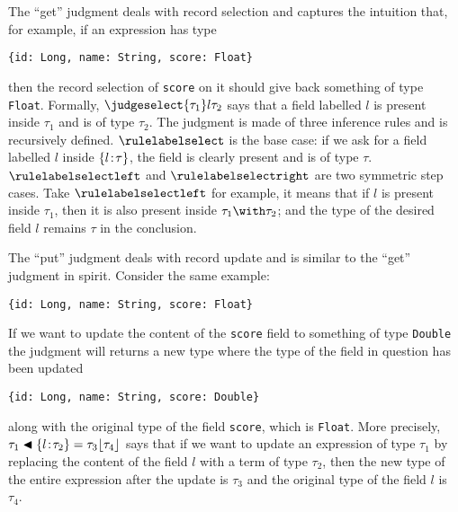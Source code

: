 The ``get'' judgment deals with record selection and captures the intuition
that, for example, if an expression has type
\begin{lstlisting}
{id: Long, name: String, score: Float}
\end{lstlisting}
then the record selection of \lstinline$score$ on it should give back something
of type \lstinline$Float$. Formally, $\judgeselect {\tau_1} l {\tau_2}$ says that a
field labelled $l$ is present inside $\tau_1$ and is of type $\tau_2$. The
judgment is made of three inference rules and is recursively defined.
$\rulelabelselect$ is the base case: if we ask for a field labelled $l$ inside
$\{ l \!:\! \tau \}$, the field is clearly present and is of type $\tau$.
$\rulelabelselectleft$ and $\rulelabelselectright$ are two symmetric step cases. Take
$\rulelabelselectleft$ for example, it means that if $l$ is present inside
$\tau_1$, then it is also present inside $\tau_1 \andop \tau_2$; and the type of
the desired field $l$ remains $\tau$ in the conclusion.

The ``put'' judgment deals with record update and is similar to the ``get''
judgment in spirit. Consider the same example:
\begin{lstlisting}
{id: Long, name: String, score: Float}
\end{lstlisting}
If we want to update the content of the \lstinline$score$ field to something of
type \lstinline$Double$ the judgment will returns a new type where the type of
the field in question has been updated
\begin{lstlisting}
{id: Long, name: String, score: Double}
\end{lstlisting}
along with the original type of the field \lstinline$score$, which is
\lstinline$Float$. More precisely,
$\tau_1 \blacktriangleleft \{ l \!:\! \tau_2 \} = \tau_3 \lfloor \tau_4 \rfloor$ says that if we want to update
an expression of type $\tau_1$ by replacing the content of the field $l$ with a
term of type $\tau_2$, then the new type of the entire expression after the
update is $\tau_3$ and the original type of the field $l$ is $\tau_4$.



